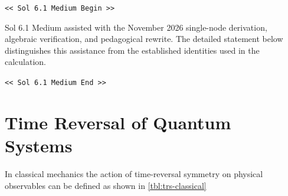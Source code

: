 \documentclass[preprint]{SciPost}
\newcommand{\vect}[1]{\boldsymbol{#1}}
\theoremstyle{plain} %
\newcommand{\GPTBegin}{\par\noindent\textcolor{GPTMarker}{\texttt{\textless\textless{} Sol 6.1 Medium Begin \textgreater\textgreater}}\par}
\newcommand{\GPTEnd}{\par\noindent\textcolor{GPTMarker}{\texttt{\textless\textless{} Sol 6.1 Medium End \textgreater\textgreater}}\par}
\begin{document}
\GPTBegin{}

Sol 6.1 Medium assisted with the November 2026 single-node derivation, algebraic verification, and pedagogical rewrite. The detailed statement below distinguishes this assistance from the established identities used in the calculation.

\GPTEnd{}


%

\printbibliography[title={Bibliography}]

\appendix

\renewcommand{\theequation}{\Alph{section}.\arabic{equation}}


\section{Time Reversal of Quantum Systems}\label{sec:time-reversal}

In classical mechanics the action of time-reversal symmetry on physical observables can be defined as shown in \autoref{tbl:trs-classical}

\end{document}
